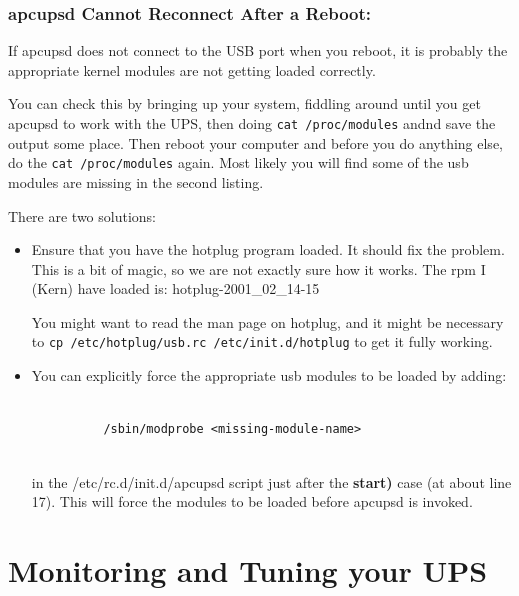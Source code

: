 {{{{\label{apcupsd-Cannot-Reconnect-After-a-Reboot}

\subsubsection*{apcupsd Cannot Reconnect After a Reboot:}

\label{index-Problems_002c-reconnect-108}
If apcupsd does not connect to the USB port when you reboot, it is probably
the appropriate kernel modules are not getting loaded correctly.  

You can check this by bringing up your system, fiddling around until you get
apcupsd to work with the UPS, then doing {\tt cat /proc/modules} andnd save
the output some place. Then reboot your computer and before you do anything
else, do the {\tt cat /proc/modules} again. Most likely you will find some of
the usb modules are missing in the second listing.  

There are two solutions:  

\begin{itemize}
\item Ensure that you have the hotplug program loaded. It should fix the
   problem. This is a bit of magic, so we are not exactly sure how it works. The
   rpm I (Kern) have loaded is: hotplug-2001\_02\_14-15  

You might want to read the man page on hotplug, and it might be necessary to
{\tt cp /etc/hotplug/usb.rc /etc/init.d/hotplug} to get it fully working.  
\item You can explicitly force the appropriate usb modules to be loaded by
   adding:  

\footnotesize
\begin{verbatim}
          
          /sbin/modprobe <missing-module-name>
     
\end{verbatim}
\normalsize

in the /etc/rc.d/init.d/apcupsd script just after the {\bf start)} case (at
about line 17). This will force the modules to be loaded before apcupsd is
invoked. 
\end{itemize}

\label{Monitoring-and-Tuning-your-UPS}

\section*{Monitoring and Tuning your UPS}

}}}}
